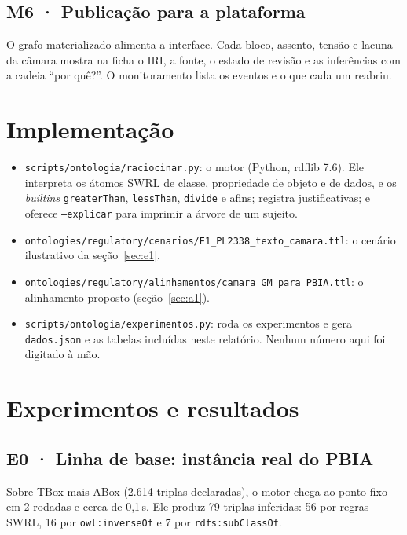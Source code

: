 \documentclass[12pt,a4paper,oneside,english,brazil]{abntex2}
\begin{document}
\section*{M6 · Publicação para a plataforma}
O grafo materializado alimenta a interface. Cada bloco, assento, tensão e lacuna da câmara mostra na ficha o IRI, a fonte, o estado de revisão e as inferências com a cadeia ``por quê?''. O monitoramento lista os eventos e o que cada um reabriu.

\chapter{Implementação}\label{cap:impl}

\begin{itemize}[leftmargin=*]
  \item \texttt{scripts/ontologia/raciocinar.py}: o motor (Python, rdflib 7.6). Ele interpreta os átomos SWRL de classe, propriedade de objeto e de dados, e os \emph{builtins} \texttt{greaterThan}, \texttt{lessThan}, \texttt{divide} e afins; registra justificativas; e oferece \texttt{--explicar} para imprimir a árvore de um sujeito.
  \item \texttt{ontologies/regulatory/cenarios/E1\_PL2338\_texto\_camara.ttl}: o cenário ilustrativo da seção~\ref{sec:e1}.
  \item \texttt{ontologies/regulatory/alinhamentos/camara\_GM\_para\_PBIA.ttl}: o alinhamento proposto (seção~\ref{sec:a1}).
  \item \texttt{scripts/ontologia/experimentos.py}: roda os experimentos e gera \texttt{dados.json} e as tabelas incluídas neste relatório. Nenhum número aqui foi digitado à mão.
\end{itemize}


\chapter{Experimentos e resultados}\label{cap:resultados}

\section{E0 · Linha de base: instância real do PBIA}
Sobre TBox mais ABox (2.614 triplas declaradas), o motor chega ao ponto fixo em 2 rodadas e cerca de 0,1\,s. Ele produz 79 triplas inferidas: 56 por regras SWRL, 16 por \texttt{owl:inverseOf} e 7 por \texttt{rdfs:subClassOf}.
\end{document}
